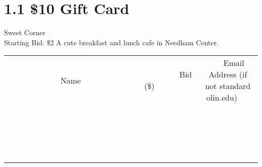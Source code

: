\documentclass[11pt]{article}
\begin{document}
\section*{1.1 \$10 Gift Card}
Sweet Corner
\\
Starting Bid: \$2
\newline
A cute breakfast and lunch cafe in Needham Center.
\\[3ex]
\begin{tabular}{c c c}
~~~~~~~~~~~~~Name~~~~~~~~~~~~~ & ~~~~~~~~~Bid (\$)~~~~~~~~~  & ~~~Email Address (if not standard olin.edu)~~~\\
 & & \\
\hline
 & & \\
\hline
 & & \\
\hline
 & & \\
\hline
 & & \\
\hline
 & & \\
\hline
 & & \\
\hline
 & & \\
\hline
 & & \\
\hline
 & & \\
\hline
 & & \\
\hline
 & & \\
\hline
 & & \\
\hline
 & & \\
\hline
 & & \\
\hline
 & & \\
\hline
 & & \\
\hline
 & & \\
\hline
 & & \\
\hline
\end{tabular}
\newpage
\end{document}
